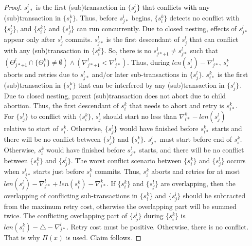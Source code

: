 \documentclass[10pt, conference, compsocconf]{IEEEtran}
\begin{document}
\begin{proof}

$s_{j*}^{l}$ is the first (sub)transaction in $\{s_{j}^{l}\}$ that
conflicts with any (sub)transaction in $\{s_{i}^{k}\}$. Thus, before
$s_{j*}^{l}$ begins, $\{s_{i}^{k}\}$ detects no conflict with $\{s_{j}^{l}\}$,
and $\{s_{i}^{k}\}$ and $\{s_{j}^{l}\}$ can run concurrently. Due
to closed nesting, effects of $s_{j*}^{l}$ appear only after $s_{j}^{l}$
commits. $s_{j*}^{l}$ is the first descendant of $s_{j}^{l}$ that
can conflict with any (sub)transaction in $\{s_{i}^{k}\}$. So, there
is no $s_{j*+1}^{l}\neq s_{j*}^{l}$ such that $\left(\Theta_{j*+1}^{l}\cap\{\Theta_{i}^{k}\}\neq\emptyset\right)\wedge\left(\nabla_{j*+1}^{l}<\nabla_{j*}^{l}\right)$.
Thus, during $len(s_{j}^{l})-\nabla_{j*}^{l}$, $s_{i}^{k}$ aborts
and retries due to $s_{j*}^{l}$ and/or later sub-transactions in
$\{s_{j}^{l}\}$. $s_{i*}^{k}$ is the first (sub)transaction in $\{s_{i}^{k}\}$
that can be interfered by any (sub)transaction in $\{s_{j}^{l}\}$.
Due to closed nesting, parent (sub)transaction does not abort due
to child abortion. Thus, the first descendant of $s_{i}^{k}$ that
needs to abort and retry is $s_{i*}^{k}$. For $\{s_{j}^{l}\}$ to
conflict with $\{s_{i}^{k}\}$, $s_{j}^{l}$ should start no less
than $\nabla_{i*}^{k}-len\left(s_{j}^{l}\right)$ relative to start
of $s_{i}^{k}$. Otherwise, $\{s_{j}^{l}\}$ would have finished before
$s_{i*}^{k}$ starts and there will be no conflict between $\{s_{j}^{l}\}$
and $\{s_{i}^{k}\}$. $s_{j*}^{l}$ must start before end of $s_{i}^{k}$.
Otherwise, $s_{i}^{k}$ would have finished before $s_{j*}^{l}$ starts,
and there will be no conflict between $\{s_{i}^{k}\}$ and $\{s_{j}^{l}\}$.
The worst conflict scenario between $\{s_{i}^{k}\}$ and $\{s_{j}^{l}\}$
occurs when $s_{j*}^{l}$ starts just before $s_{i}^{k}$ commits.
Thus, $s_{i}^{k}$ aborts and retries for at most $len(s_{j}^{l})-\nabla_{j*}^{l}+len(s_{i}^{k})-\nabla_{i*}^{k}$.
If $\{s_{i}^{k}\}$ and $\{s_{j}^{l}\}$ are overlapping, then the
overlapping of conflicting sub-transactions in $\{s_{i}^{k}\}$ and
$\{s_{j}^{l}\}$ should be subtracted from the maximum retry cost,
otherwise the overlapping part will be summed twice. The conflicting
overlapping part of $\{s_{j}^{l}\}$ during $\{s_{i}^{k}\}$ is $len(s_{i}^{k})-\triangle-\nabla_{j*}^{l}$.
Retry cost must be positive. Otherwise, there is no conflict. That
is why $\Pi(x)$ is used. Claim follows.

\end{proof}
\end{document}
